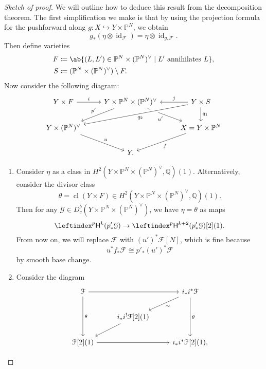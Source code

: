 \documentclass{amsart}
\theoremstyle{definition}
\theoremstyle{remark}
\theoremstyle{plain}
\theoremstyle{definition}
\theoremstyle{remark}
\newcommand{\Q}{\mathbb{Q}}
\renewcommand{\P}{\mathbb{P}}
\newcommand{\sH}{\mathsf{H}}
\newcommand{\mc}[1]{\mathcal{#1}}
\newcommand{\on}[1]{\operatorname{#1}}
\newcommand{\1}{\mathbf{1}}
\newcommand{\2}{\mathbf{2}}
\newcommand{\3}{\mathbf{3}}
\begin{document}
\begin{proof}[Sketch of proof]
    We will outline how to deduce this result from the decomposition theorem. The first simplification we make is that by using the projection formula for the pushforward along $g \colon X \hookrightarrow Y \times \P^N$, we obtain
    \[ g_* (\eta \otimes \on{id}_{\mc{F}}) = \eta \otimes \on{id}_{g_* \mc{F}}. \]
    Then define varieties
    \begin{align*}
        F &\coloneqq \ab\{(L, L') \in \P^N \times (\P^N)^{\vee} \mid L' \text{ annihilates } L \}, \\
        S &\coloneqq (\P^N \times (\P^N)^{\vee}) \setminus F.
    \end{align*}
    Now consider the following diagram:
    \begin{equation*}
    \begin{tikzcd}
        Y \times F \ar{r}{i} & Y \times \P^N \times (\P^N)^{\vee} \ar[swap]{dl}{p'} \ar[swap]{dr}{u'} & Y \times S \ar[crossing over]{dll}{q_2} \ar[swap]{l}{j} \ar{d}{q_1} \\
        Y \times (\P^N)^{\vee} \ar{dr}{u} & & X = Y \times \P^N \ar{dl}{f} \\
        & Y.
    \end{tikzcd}
    \end{equation*}
    \begin{enumerate}
        \item Consider $\eta$ as a class in $H^2(Y \times \P^N \times (\P^N)^{\vee}, \Q)(1)$. Alternatively, consider the divisor class
            \[ \theta = \on{cl}(Y \times F) \in H^2(Y \times \P^N \times (\P^N)^{\vee}, \Q)(1). \]
            Then for any $\mc{G} \in D^b_c(Y \times \P^N \times (\P^N)^{\vee})$, we have $\eta = \theta$ as maps
            \[ \leftindex^p \sH^k(p'_* \mc{G}) \to \leftindex^p \sH^{k+2}(p'_* \mc{G})[2](1). \]
            From now on, we will replace $\mc{F}$ with $(u')^* \mc{F}[N]$, which is fine because
            \[ u^* f_* \mc{F} \cong p'_* (u')^* \mc{F} \]
            by smooth base change.
        \item Consider the diagram
            \begin{equation*}
            \begin{tikzcd}
                \mc{F} \ar{rr} \ar{dd}{\theta} & & i_* i^* \mc{F} \ar{dd}{\theta} \ar{dl}{\sim} \\
                & i_* i^! \mc{F}[2](1) \ar{dl} \\
                \mc{F}[2](1) \ar{rr} & & i_* i^* \mc{F}[2](1),
            \end{tikzcd}

\end{equation*}
\end{enumerate}
\end{proof}
\end{document}

